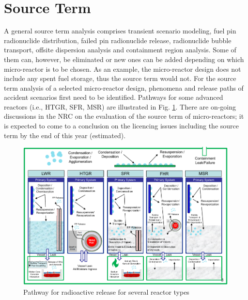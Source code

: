 \documentclass[10pt,a4paper]{article}
\begin{document}
\section{Source Term}
A general source term analysis comprises transient scenario modeling, fuel pin radionuclide distribution, failed pin radionuclide release, radionuclide bubble transport, offsite dispersion analysis and containment region analysis. Some of them can, however, be eliminated or new ones can be added depending on which micro-reactor is to be chosen. As an example, the micro-reactor design does not include any spent fuel storage, thus the source term would not.
For the source term analysis of a selected micro-reactor design, phenomena and release paths of accident scenarios first need to be identified. Pathways for some advanced reactors (i.e., HTGR, SFR, MSR) are illustrated in Fig. \ref{pathway}. There are on-going discussions in the NRC on the evaluation of the source term of micro-reactors; it is expected to come to a conclusion on the licencing issues including the source term by the end of this year (estimated). 

\begin{figure}[hbtp]
\centering
\includegraphics[scale=0.6]{Figs/fig6*.jpeg}
\caption{Pathway for radioactive release for several reactor types}
\label{pathway}
\end{figure}
\end{document}
